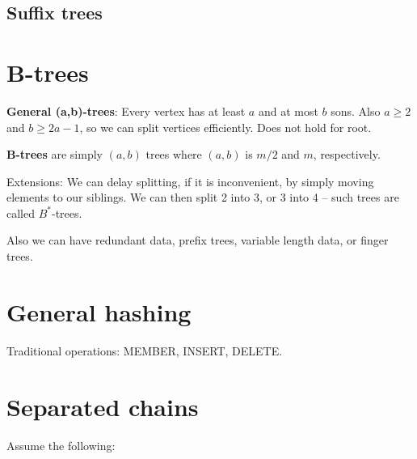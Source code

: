 
\subsection{Suffix trees}


\section{B-trees}

{\bf General (a,b)-trees}: Every vertex has at least $a$ and at most $b$ sons. Also $a ≥ 2$ and $b ≥ 2a -1$,
so we can split vertices efficiently. Does not hold for root.


{\bf B-trees} are simply $(a,b)$ trees where $(a,b)$ is $m/2$ and $m$, respectively.

Extensions: We can delay splitting, if it is inconvenient, by simply moving elements to our siblings.
We can then split 2 into 3, or 3 into 4 -- such trees are called $B^*$-trees.

Also we can have redundant data, prefix trees, variable length data, or finger trees.

\section{General hashing}

Traditional operations: MEMBER, INSERT, DELETE.


\section{Separated chains}
Assume the following:

